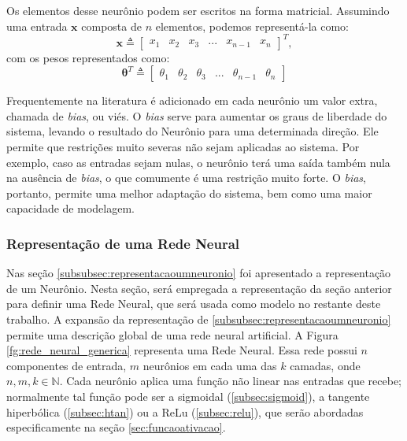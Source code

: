 Os elementos desse neurônio podem ser escritos na forma matricial. Assumindo uma entrada $\boldsymbol{x}$ composta de $n$ elementos, podemos representá-la como:
\begin{equation}
  \mathbf{x} \triangleq \begin{bmatrix}x_{1}&x_{2}&x_{3}&...&x_{n-1}&x_{n} \end{bmatrix}^T,
\end{equation}
 com os pesos representados como:
 \begin{equation}
  \mathbf{\theta}^T \triangleq \begin{bmatrix}\theta_{1}&\theta_{2}&\theta_{3}&...&\theta_{n-1}&\theta_{n}\end{bmatrix}
\end{equation}

Frequentemente na literatura \cite{haykin2004comprehensive, haykin2009neural, lecun2015deep} é adicionado em cada neurônio um valor extra, chamada de \textit{bias}, ou viés. O \textit{bias} serve para aumentar os graus de liberdade do sistema, levando o resultado do Neurônio para uma determinada direção. Ele permite que restrições muito severas não sejam aplicadas ao sistema. Por exemplo, caso as entradas sejam nulas, o neurônio terá uma saída também nula na ausência de \textit{bias}, o que comumente é uma restrição muito forte. O  \textit{bias}, portanto,  permite uma melhor adaptação do sistema, bem como uma maior capacidade de modelagem.


\subsubsection{Representação de uma Rede Neural}
\label{subsubsec:representacaoumaredeneural}
Nas seção \ref{subsubsec:representacaoumneuronio} foi apresentado a representação de um Neurônio. Nesta seção, será empregada a representação da seção anterior para definir uma Rede Neural, que será usada como modelo no restante deste trabalho. A expansão da representação de \ref{subsubsec:representacaoumneuronio} permite uma descrição global de uma rede neural artificial. A Figura \ref{fg:rede_neural_generica} representa uma Rede Neural. Essa rede possui $n$ componentes de entrada, $m$ neurônios em cada uma das $k$ camadas, onde $n, m, k\in \mathbb{N}$. Cada neurônio aplica uma função não linear nas entradas que recebe; normalmente tal função pode ser a sigmoidal (\ref{subsec:sigmoid}), a tangente hiperbólica (\ref{subsec:htan}) ou a ReLu (\ref{subsec:relu}), que serão abordadas especificamente na seção \ref{sec:funcaoativacao}.

